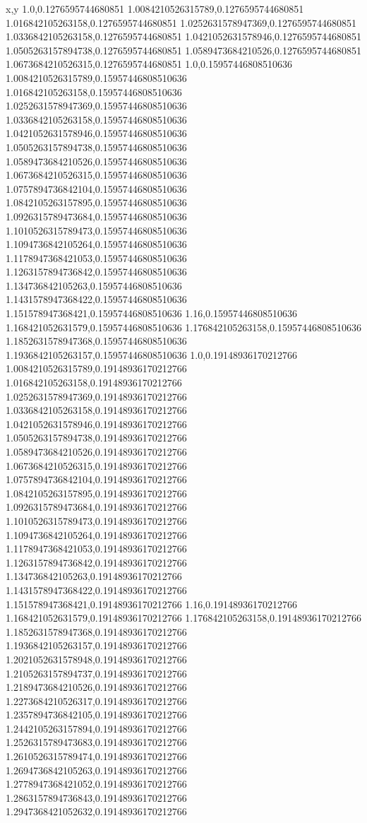 x,y
1.0,0.1276595744680851
1.0084210526315789,0.1276595744680851
1.016842105263158,0.1276595744680851
1.0252631578947369,0.1276595744680851
1.0336842105263158,0.1276595744680851
1.0421052631578946,0.1276595744680851
1.0505263157894738,0.1276595744680851
1.0589473684210526,0.1276595744680851
1.0673684210526315,0.1276595744680851
1.0,0.15957446808510636
1.0084210526315789,0.15957446808510636
1.016842105263158,0.15957446808510636
1.0252631578947369,0.15957446808510636
1.0336842105263158,0.15957446808510636
1.0421052631578946,0.15957446808510636
1.0505263157894738,0.15957446808510636
1.0589473684210526,0.15957446808510636
1.0673684210526315,0.15957446808510636
1.0757894736842104,0.15957446808510636
1.0842105263157895,0.15957446808510636
1.0926315789473684,0.15957446808510636
1.1010526315789473,0.15957446808510636
1.1094736842105264,0.15957446808510636
1.1178947368421053,0.15957446808510636
1.1263157894736842,0.15957446808510636
1.134736842105263,0.15957446808510636
1.1431578947368422,0.15957446808510636
1.151578947368421,0.15957446808510636
1.16,0.15957446808510636
1.168421052631579,0.15957446808510636
1.176842105263158,0.15957446808510636
1.1852631578947368,0.15957446808510636
1.1936842105263157,0.15957446808510636
1.0,0.19148936170212766
1.0084210526315789,0.19148936170212766
1.016842105263158,0.19148936170212766
1.0252631578947369,0.19148936170212766
1.0336842105263158,0.19148936170212766
1.0421052631578946,0.19148936170212766
1.0505263157894738,0.19148936170212766
1.0589473684210526,0.19148936170212766
1.0673684210526315,0.19148936170212766
1.0757894736842104,0.19148936170212766
1.0842105263157895,0.19148936170212766
1.0926315789473684,0.19148936170212766
1.1010526315789473,0.19148936170212766
1.1094736842105264,0.19148936170212766
1.1178947368421053,0.19148936170212766
1.1263157894736842,0.19148936170212766
1.134736842105263,0.19148936170212766
1.1431578947368422,0.19148936170212766
1.151578947368421,0.19148936170212766
1.16,0.19148936170212766
1.168421052631579,0.19148936170212766
1.176842105263158,0.19148936170212766
1.1852631578947368,0.19148936170212766
1.1936842105263157,0.19148936170212766
1.2021052631578948,0.19148936170212766
1.2105263157894737,0.19148936170212766
1.2189473684210526,0.19148936170212766
1.2273684210526317,0.19148936170212766
1.2357894736842105,0.19148936170212766
1.2442105263157894,0.19148936170212766
1.2526315789473683,0.19148936170212766
1.2610526315789474,0.19148936170212766
1.2694736842105263,0.19148936170212766
1.2778947368421052,0.19148936170212766
1.2863157894736843,0.19148936170212766
1.2947368421052632,0.19148936170212766
